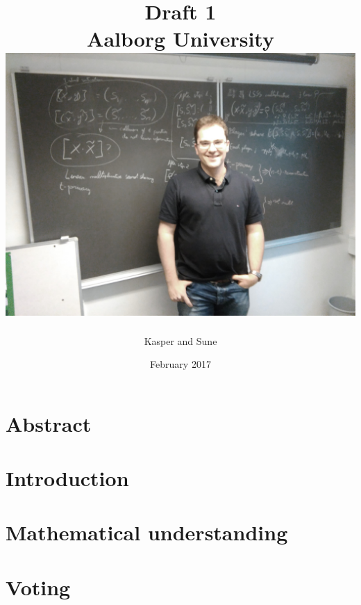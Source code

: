 \documentclass[a4paper]{report}
\title{
    Draft 1 \\
	Aalborg University \\
    \includegraphics[scale=0.1]{Ignacio.jpg}
}
\author{Kasper and  Sune}
\date{February 2017}
\theoremstyle{plain}
\begin{document}
\maketitle
\clearpage

\chapter*{Abstract}

\clearpage

\tableofcontents
\clearpage


\chapter{Introduction}
    
    
    
    
    
    
    
    
    

\clearpage
\chapter{Mathematical understanding}
    
    
    
    
    
    
    
    
    
    
    
    
    
    
 \clearpage
\chapter{Voting}    
    
\end{document}
